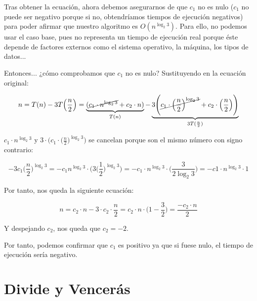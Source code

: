 \documentclass[10pt,a4paper,spanish]{report}
\begin{document}
Tras obtener la ecuación, ahora debemos asegurarnos de que $c_1$ no es nulo ($c_1$ no puede ser negativo porque si no, obtendríamos tiempos de ejecución negativos) para poder afirmar que nuestro algoritmo es $O(n^{\log_2 3})$. Para ello, no podemos usar el caso base, pues no representa un tiempo de ejecución real porque éste depende de factores externos como el sistema operativo, la máquina, los tipos de datos... %

Entonces... ¿cómo comprobamos que $c_1$ no es nulo? Sustituyendo en la ecuación original:

\begin{center}
\begin{displaymath}
n = T(n) - 3T\Big(\frac{n}{2}\Big) = \underbrace{(\cancel{c_1 \cdot n^{\log_2 3}} + c_2 \cdot n)}_{T(n)} - \underbrace{3\Bigg(\cancel{c_1 \cdot \Big(\frac{n}{2}\Big)^{\log_2 3}} + c_2 \cdot \Big(\frac{n}{2}\Big)\Bigg)}_{3T(\frac{n}{2})}
\end{displaymath}

$c_1 \cdot n^{\log_2 3}$ y $3 \cdot \Bigg(c_1 \cdot \Big(\frac{n}{2}\Big)^{\log_2 3}\Bigg)$ se cancelan porque son el mismo número con signo contrario:

\begin{displaymath}
-3 c_1 \Big(\frac{n}{2}\Big)^{\log_2 3} = - c_1 n^{\log_2 3} \cdot \Big(3 \Big(\frac{1}{2}\Big)^{\log_2 3}\Big) = -c_1 \cdot n^{\log_2 3} \cdot \Big(\frac{3}{2 \log_2 3}\Big) = -c1 \cdot n^{\log_2 3} \cdot 1
\end{displaymath}

Por tanto, nos queda la siguiente ecuación:

\begin{displaymath}
n = c_2 \cdot n - 3 \cdot c_2 \cdot \frac{n}{2} = c_2 \cdot n \cdot \Big(1 - \frac{3}{2}\Big) =  \frac{-c_2 \cdot n}{2}
\end{displaymath}

Y despejando $c_2$, nos queda que $c_2 = -2$.
\end{center}

Por tanto, podemos confirmar que $c_1$ es positivo ya que si fuese nulo, el tiempo de ejecución sería negativo.

\chapter{\textcolor[rgb]{0.5,1,0.2}Divide y Vencerás}
\end{document}

